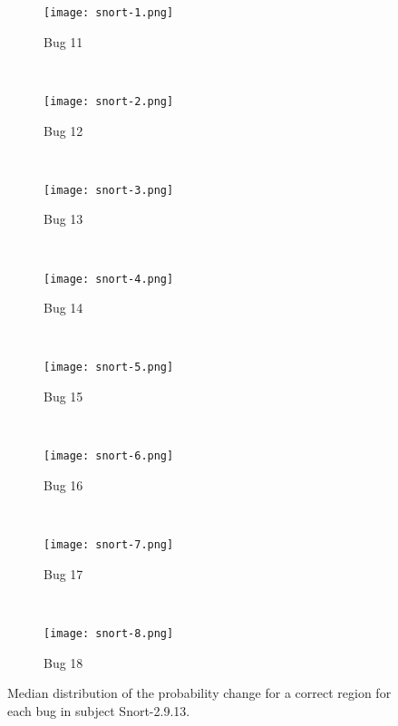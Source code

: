 \begin{figure*}[h]
\scriptsize
\centering
    \begin{subfigure}[]{0.12\textwidth}
        \centering
       \texttt{[image: snort-1.png]}
       \label{fig:snort-1}
       \caption{Bug 11}
    \end{subfigure}%
    ~
    \begin{subfigure}[]{0.12\textwidth}
        \centering
       \texttt{[image: snort-2.png]}
       \label{fig:snort-2}
       \caption{Bug 12}
    \end{subfigure}%
    ~
    \begin{subfigure}[]{0.12\textwidth}
        \centering
       \texttt{[image: snort-3.png]}
       \label{fig:snort-3}
       \caption{Bug 13}
    \end{subfigure}%
    ~
    \begin{subfigure}[]{0.12\textwidth}
        \centering
       \texttt{[image: snort-4.png]}
       \label{fig:snort-4}
       \caption{Bug 14}
    \end{subfigure}%
    ~
        \begin{subfigure}[]{0.12\textwidth}
        \centering
       \texttt{[image: snort-5.png]}
       \label{fig:snort-5}
       \caption{Bug 15}
    \end{subfigure}%
    ~
    \begin{subfigure}[]{0.12\textwidth}
        \centering
       \texttt{[image: snort-6.png]}
       \label{fig:snort-6}
       \caption{Bug 16}
    \end{subfigure}%
    ~
    \begin{subfigure}[]{0.12\textwidth}
        \centering
       \texttt{[image: snort-7.png]}
       \label{fig:snort-7}
       \caption{Bug 17}
    \end{subfigure}%
    ~
    \begin{subfigure}[]{0.12\textwidth}
        \centering
       \texttt{[image: snort-8.png]}
       \label{fig:snort-8}
       \caption{Bug 18}
    \end{subfigure}%
    
    
\caption{Median distribution of the probability change for a correct region for each bug in subject Snort-2.9.13. }
\label{fig:probability-distribution}
\vspace{-2em}
\end{figure*}


